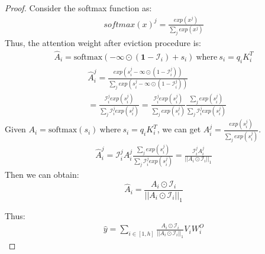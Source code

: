 \begin{proof}
	Consider the softmax function as:
	\begin{align}
		softmax(x)^j = \frac{exp(x^j)}{\sum_j exp(x^j)}
	\end{align}
	Thus, the attention weight after eviction procedure is:
	{
		\begin{align}
			\hat{A}_i  = \text{softmax}(-\infty \odot ( \textbf{1} - \mathcal{I}_i) + s_i) \:\text{where} \: s_i = q_i K_i^T 
		\end{align}
	} 
	\begin{align}
		&\hat{A}_i^j =  \frac{exp(s_i^j-\infty \odot ( 1 - \mathcal{I}_i^j))}{\sum_j exp(s_i^j-\infty \odot ( 1 - \mathcal{I}_i^j))} \\
		&= \frac{\mathcal{I}_i^jexp(s_i^j)}{\sum_j \mathcal{I}_i^jexp(s_i^j)} = \frac{  \mathcal{I}_i^j exp(s^j_i) }{\sum_j exp(s^j_i)}\frac{\sum_j exp(s^j_i)}{\sum_j  \mathcal{I}_i^jexp(s^j_i) } 
	\end{align}
	Given $ A_i  = \text{softmax}(s_i) \:\text{where} \: s_i = q_i K_i^T$, we can get $A_i^j = \frac{exp(s_i^j)}{\sum_j exp(s_i^j)}$.
	\begin{align}
		\hat{A}_i^j  = \mathcal{I}_i^j A_i^j \frac{\sum_j exp(s^j_i)}{\sum_j  \mathcal{I}_i^jexp(s^j_i) } =\frac{ \mathcal{I}_i^j A_i^j}{||A_i \odot \mathcal{I}_i||_1}
	\end{align}
	Then we can obtain:
	\begin{equation}
		\hat{A}_i = \frac{A_i \odot \mathcal{I}_i}{||A_i \odot \mathcal{I}_i||_1}
	\end{equation}
	
	
	Thus:
	\begin{align}
		\hat{y} = \sum_{i \in [1, h]} \frac{A_i \odot \mathcal{I}_i}{||A_i \odot \mathcal{I}_i||_1} V_i W_i^O 
	\end{align}
	

\end{proof}
